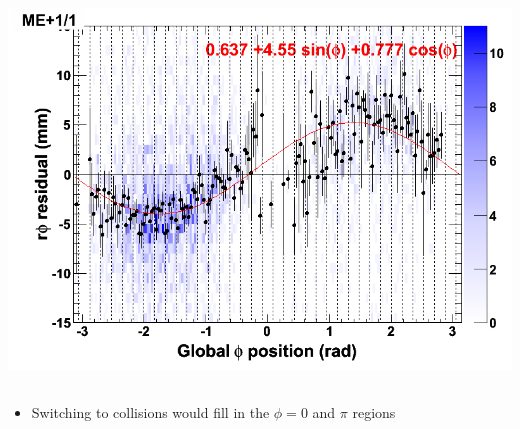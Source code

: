 \documentclass[compress]{beamer}
\begin{document}
\begin{frame}
\begin{columns}
\vspace{-0.25 cm}
\includegraphics[width=\linewidth]{endcap_allmomenta.png}
\end{columns}

\begin{itemize}
\item Switching to collisions would fill in the $\phi = 0$ and $\pi$ regions
\end{itemize}
\end{frame}
\end{document}
